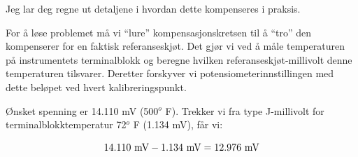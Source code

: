 \vskip 10pt

Jeg lar deg regne ut detaljene i hvordan dette kompenseres i praksis.







For å løse problemet må vi ``lure'' kompensasjonskretsen til å ``tro'' den kompenserer for en faktisk referanseskjøt. Det gjør vi ved å måle temperaturen på instrumentets terminalblokk og beregne hvilken referanseskjøt-millivolt denne temperaturen tilsvarer. Deretter forskyver vi potensiometerinnstillingen med dette beløpet ved hvert kalibreringspunkt.

\vskip 10pt

Ønsket spenning er 14.110 mV (500$^{o}$ F). Trekker vi fra type J-millivolt for terminalblokktemperatur 72$^{o}$ F (1.134 mV), får vi:

$$14.110 \hbox{ mV} - 1.134 \hbox{ mV} = 12.976 \hbox{ mV}$$


